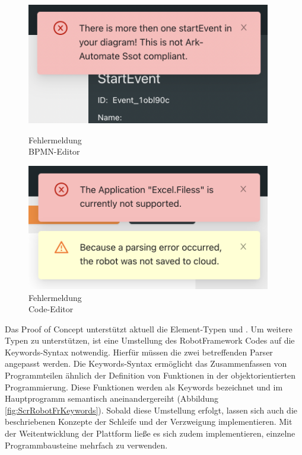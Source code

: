 \begin{figure}[!htb]
    \centering
    \begin{minipage}{.5\textwidth}
        \centering
        \includegraphics[width=0.95\textwidth, height=0.17\textheight]{Bachelorarbeit/images/ScreenshotErrorBPMN3.png}
        \caption{Fehlermeldung \\ BPMN-Editor}
        \label{fig:errorBPMN}
    \end{minipage}%
    \begin{minipage}{0.5\textwidth}
        \centering
        \includegraphics[width=0.95\textwidth, height=0.17\textheight]{Bachelorarbeit/images/ScreenshotErrorROBOT.png}
        \caption{Fehlermeldung \\ Code-Editor}
        \label{fig:errorROBOT}
    \end{minipage}
\end{figure}

Das Proof of Concept unterstützt aktuell die Element-Typen  und . Um weitere Typen zu unterstützen, ist eine Umstellung des \mbox{RobotFramework} Codes auf die Keywords-Syntax notwendig. Hierfür müssen die zwei betreffenden Parser angepasst werden. Die Keywords-Syntax ermöglicht das Zusammenfassen von Programmteilen ähnlich der Definition von Funktionen in der objektorientierten Programmierung. Diese Funktionen werden als Keywords bezeichnet und im Hauptprogramm semantisch aneinandergereiht (Abbildung \ref{fig:ScrRobotFrKeywords}). Sobald diese Umstellung erfolgt, lassen sich auch die beschriebenen Konzepte der Schleife und der Verzweigung implementieren. Mit der Weitentwicklung der Plattform ließe es sich zudem implementieren, einzelne Programmbausteine mehrfach zu verwenden.

